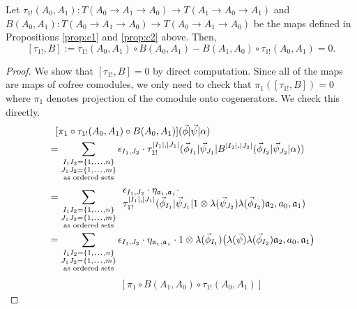 \begin{prop}
\label{prop:c3}
Let $\tau_{1!}(A_0,A_1): 
T(A_0 \to A_1 \to A_0) \longrightarrow
T(A_1 \to A_0 \to A_1)$ and 
$B(A_0,A_1): T(A_0 \to A_1 \to A_0) 
\longrightarrow T(A_0 \to A_1 \to A_0)$ 
be the maps defined in Propositions 
\ref{prop:c1} and \ref{prop:c2} above. 
Then, $$[\tau_{1!}, B] := 
\tau_{1!}(A_0,A_1) \circ B(A_0,A_1) - 
B(A_1,A_0) \circ \tau_{1!}(A_0,A_1) = 0.$$
\end{prop}
%
\begin{proof}
We show that $[\tau_{1!}, B] = 0$ by direct 
computation. Since all of the maps are maps 
of cofree comodules, we only need to check 
that $\pi_1([\tau_{1!}, B]) = 0$ where 
$\pi_1$ denotes projection of the comodule 
onto cogenerators. We check this directly.
%
\begin{align*}
&\phantom{=}
[\pi_1 \circ \tau_{1!}(A_0,A_1) \circ B(A_0,A_1)] 
  (\vec{\phi} | \vec{\psi} | \alpha ) \\
&= \sum \limits_{\substack{
  I_1I_2 = \{1,\smdots,n\}\\
  J_1J_2 = \{1,\smdots,m\}\\
  \textrm{as ordered sets}}}
\epsilon_{I_1,J_2} \cdot
  \tau_{1!}^{|I_1|, |J_1|} (\vec{\phi}_{I_1} | \vec{\psi}_{J_1} | 
    B^{|I_2|, |J_2|} (\vec{\phi}_{I_2} | \vec{\psi}_{J_2} | \alpha)) \\
&= 
\sum \limits_{\substack{
  I_1I_2 = \{1,\smdots,n\}\\
  J_1J_2 = \{1,\smdots,m\}\\
  \textrm{as ordered sets}}}
\begin{array}{l}  
\epsilon_{I_1,J_2} \cdot 
\eta_{\mathfrak{a_1},\mathfrak{a_2}} \cdot\\
\tau_{1!}^{|I_1|, |J_1|} (\vec{\phi}_{I_1} | \vec{\psi}_{J_1} | 
  1 \otimes \lambda(\vec{\psi}_{J_2}) \lambda(\vec{\phi}_{I_2}) 
  \mathfrak{a}_2, a_0, \mathfrak{a}_1)
\end{array} \\
&= 
\sum \limits_{\substack{
  I_1I_2 = \{1,\smdots,n\}\\
  J_1J_2 = \{1,\smdots,m\}\\
  \textrm{as ordered sets}}}
\epsilon_{I_1,J_2} \cdot 
\eta_{\mathfrak{a_1},\mathfrak{a_2}} \cdot
1 \otimes \lambda(\vec{\phi}_{I_1}) \big( 
  \lambda(\vec{\psi}) \lambda(\vec{\phi}_{I_2}) 
  \mathfrak{a}_2, a_0, \mathfrak{a}_1 \big)
\end{align*}
%
\begin{align*}
& \phantom{{}={}}
[\pi_1 \circ B(A_1,A_0) \circ \tau_{1!}(A_0,A_1)] 

\end{align*}
\end{proof}
